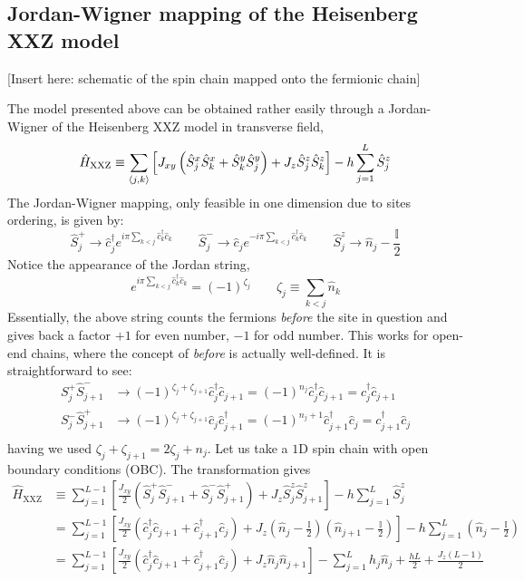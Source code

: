 \subsection{Jordan-Wigner mapping of the Heisenberg XXZ model}

{\color{tabred}[Insert here: schematic of the spin chain mapped onto the fermionic chain]}

The model presented above can be obtained rather easily through a Jordan-Wigner of the Heisenberg XXZ model in transverse field,
\begin{equation}\label{eq:xxz-hamiltonian}
	\hat H_\mathrm{XXZ} \equiv \sum_{\ev{j,k}} \left[
		J_{xy} \left( 
			\hat S_j^x \hat S_k^x + \hat S_k^y \hat S_j^y
		\right) + J_z \hat S_j^z \hat S_k^z
	\right] - h \sum_{j=1}^L \hat S_j^z 
\end{equation}
The Jordan-Wigner mapping, only feasible in one dimension due to sites ordering, is given by:
\[
	\hat S_j^+ \to \hat c_j^\dagger e^{i\pi \sum_{k < j} \hat c_k^\dagger \hat c_k}
	\qquad
	\hat S_j^- \to \hat c_j e^{- i\pi \sum_{k < j} \hat c_k^\dagger \hat c_k}
	\qquad
	\hat S_j^z \to \hat n_j - \frac{\mathbb{I}}{2}
\]
Notice the appearance of the Jordan string,
\[
	e^{i\pi \sum_{k < j} \hat c_k^\dagger \hat c_k} = (-1)^{\zeta_j}
	\qquad
	\zeta_j \equiv \sum_{k < j} \hat n_k
\]
Essentially, the above string counts the fermions \textit{before} the site in question and gives back a factor $+1$ for even number, $-1$ for odd number. This works for open-end chains, where the concept of \textit{before} is actually well-defined. It is straightforward to see:
\[
	\begin{aligned}
		S_j^+ \hat S_{j+1}^- &\to (-1)^{\zeta_j + \zeta_{j+1}} \hat c_j^\dagger \hat c_{j+1} = (-1)^{n_j} \hat c_j^\dagger \hat c_{j+1} = c_j^\dagger \hat c_{j+1} \\
		S_j^- \hat S_{j+1}^+ &\to (-1)^{\zeta_j + \zeta_{j+1}} \hat c_j \hat c_{j+1}^\dagger = (-1)^{n_j+1} \hat c_{j+1}^\dagger \hat c_j = c_{j+1}^\dagger \hat c_j \\
	\end{aligned}
\]
having we used $\zeta_j + \zeta_{j+1} = 2 \zeta_j + n_j$.
Let us take a $1\mathrm{D}$ spin chain with open boundary conditions (OBC). The transformation gives
\[
	\begin{aligned}
		\hat H_\mathrm{XXZ} &\equiv \sum_{j=1}^{L-1} \left[
			\frac{J_{xy}}{2} \left( 
				\hat S_j^+ \hat S_{j+1}^- + \hat S_j^- \hat S_{j+1}^+
			\right) + J_z \hat S_j^z \hat S_{j+1}^z
		\right] - h \sum_{j=1}^L \hat S_j^z \\
		&= \sum_{j=1}^{L-1} \left[
			\frac{J_{xy}}{2} \left(
				\hat c_j^\dagger \hat c_{j+1} + \hat c_{j+1}^\dagger \hat c_j
			\right) + J_z \left(
				\hat n_j - \frac{\mathbb{I}}{2}
			\right) \left(
				\hat n_{j+1} - \frac{\mathbb{I}}{2}
			\right)
		\right] - h \sum_{j=1}^L \left(
			\hat n_{j} - \frac{\mathbb{I}}{2}
		\right) \\
		&= \sum_{j=1}^{L-1} \left[
			\frac{J_{xy}}{2} \left(
				\hat c_j^\dagger \hat c_{j+1} + \hat c_{j+1}^\dagger \hat c_j
			\right) + J_z \hat n_j \hat n_{j+1}
		\right] - \sum_{j=1}^L h_j \hat n_{j}
		+ \frac{hL}{2} + \frac{J_z (L-1)}{2}
	\end{aligned}
\]
